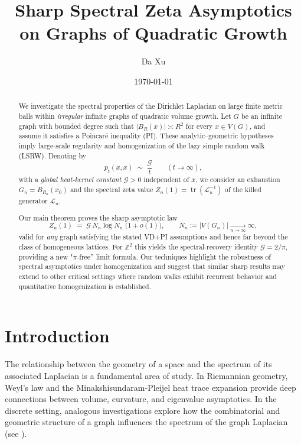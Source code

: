 \documentclass[12pt]{amsart}
\title{Sharp Spectral Zeta Asymptotics on Graphs of Quadratic Growth}
\author{Da Xu}
\date{\today}
\theoremstyle{definition}
\theoremstyle{remark}
\newcommand{\cG}{\mathcal{G}}    %
\newcommand{\LL}{\mathcal{L}} %
\begin{document}
\begin{abstract}
We investigate the spectral properties of the Dirichlet Laplacian on large finite metric balls within \emph{irregular} infinite graphs of quadratic volume growth.
Let $G$ be an infinite graph with bounded degree such that $|B_R(x)| \asymp R^{2}$ for every $x\in V(G)$, and assume it satisfies a Poincaré inequality (PI).
These analytic--geometric hypotheses imply large-scale regularity and homogenization of the lazy simple random walk (LSRW).
Denoting by
\[
    p_t(x,x)\;\sim\;\frac{\cG}{t}\qquad(t\to\infty),
\]
with a \emph{global heat-kernel constant} $\cG>0$ independent of $x$, we consider an exhaustion $G_n=B_{R_n}(x_0)$ and the spectral zeta value
$Z_n(1)=\operatorname{tr}(\LL_n^{-1})$ of the killed generator $\LL_n$.

Our main theorem proves the sharp asymptotic law
\[
    Z_n(1)\;=\;\cG\,N_n\log N_n\;\bigl(1+o(1)\bigr),\qquad N_n:=|V(G_n)|\xrightarrow[n\to\infty]{}\infty,
\]
valid for \emph{any} graph satisfying the stated VD+PI assumptions and hence far beyond the class of homogeneous lattices.
For $\mathbb Z^2$ this yields the spectral-recovery identity $\cG=2/\pi$, providing a new "$\pi$-free'' limit formula.
Our techniques highlight the robustness of spectral asymptotics under homogenization and suggest that similar sharp results may extend to other critical settings where random walks exhibit recurrent behavior and quantitative homogenization is established.
\end{abstract}

\maketitle

\section{Introduction}

The relationship between the geometry of a space and the spectrum of its associated Laplacian is a fundamental area of study. In Riemannian geometry, Weyl's law and the Minakshisundaram-Pleijel heat trace expansion provide deep connections between volume, curvature, and eigenvalue asymptotics. In the discrete setting, analogous investigations explore how the combinatorial and geometric structure of a graph influences the spectrum of the graph Laplacian (see \cite{Chung97}).
\end{document}
